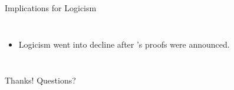 \documentclass{beamer}
\begin{document}
\begin{frame}{Implications for Logicism}
\begin{columns}[c]
    \begin{itemize}
    \item Logicism went into decline after \godel's proofs were announced.
    \end{itemize}
  \end{columns}
\end{frame}

\begin{frame}{Thanks!}
  Questions?
\end{frame}
\end{document}
